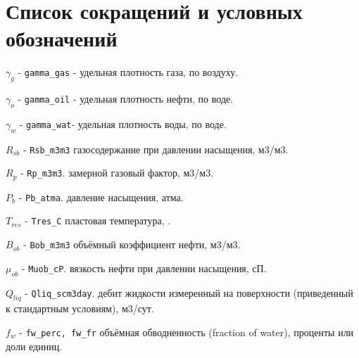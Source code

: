 \chapter*{Список сокращений и условных обозначений} %
\noindent

$\gamma_g$  - \texttt{gamma_gas} - удельная плотность газа, по воздуху. 

$\gamma_o$  - \texttt{gamma_oil} - удельная плотность нефти, по воде.

$\gamma_w$  - \texttt{gamma_wat}- удельная плотность воды, по воде. 

$R_{sb}$ - \texttt{Rsb_m3m3} газосодержание при давлении насыщения, м3/м3. 

$R_p$ - \texttt{Rp_m3m3}. замерной газовый фактор, м3/м3.

$P_b$ - \texttt{Pb_atma}. давление насыщения, атма.  

$T_{res}$ - \texttt{Tres_C} пластовая температура, \textcelsius. 

$B_{ob}$ - \texttt{Bob_m3m3} объёмный коэффициент нефти, м3/м3. 

$\mu_{ob}$ - \texttt{Muob_cP}. вязкость нефти при давлении насыщения, сП. 

$Q_{liq}$ - \texttt{Qliq_scm3day}. дебит жидкости измеренный на поверхности (приведенный к стандартным условиям), м3/сут. 

$f_{w}$ - \texttt{fw_perc, fw_fr} объёмная обводненность (fraction of water), проценты или доли единиц. 